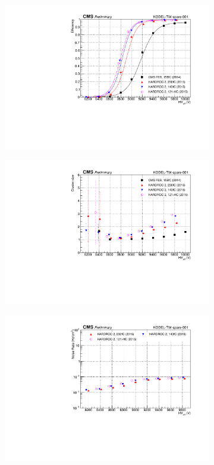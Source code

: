 	\begin{figure}[H]
		\begin{subfigure}{.5\linewidth}
		    \centering
			\includegraphics[width=\linewidth]{fig/chapt6/HARDROC2-Eff-Shift.pdf}
			\caption{\label{fig:HARDROC2:A}}
		\end{subfigure}
		\begin{subfigure}{.5\linewidth}
		    \centering
			\includegraphics[width = \linewidth]{fig/chapt6/HARDROC2-ClS-Shift.pdf}
			\caption{\label{fig:HARDROC2:B}}
		\end{subfigure}
		\begin{subfigure}{\linewidth}
		    \centering
			\includegraphics[width = .5\linewidth]{fig/chapt6/HARDROC2-Rate-Shift.pdf}

\end{subfigure}
\end{figure}
